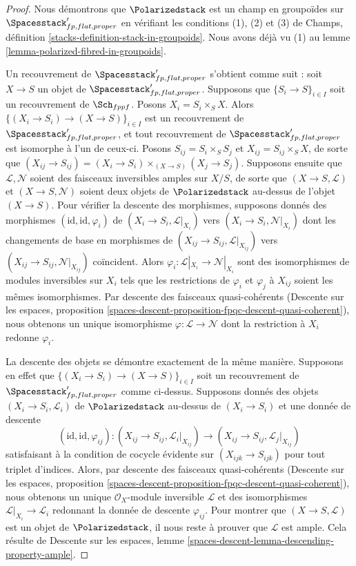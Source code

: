 \begin{proof}
Nous démontrons que $\Polarizedstack$ est un champ en groupoïdes sur
$\Spacesstack'_{fp, flat, proper}$ en vérifiant les conditions (1), (2) et (3)
de Champs, définition \ref{stacks-definition-stack-in-groupoids}.
Nous avons déjà vu (1) au lemme
\ref{lemma-polarized-fibred-in-groupoids}.

\medskip\noindent
Un recouvrement de $\Spacesstack'_{fp, flat, proper}$ s'obtient comme suit :
soit $X \to S$ un objet de $\Spacesstack'_{fp, flat, proper}$.
Supposons que $\{S_i \to S\}_{i \in I}$ soit un recouvrement de
$\Sch_{fppf}$. Posons $X_i = S_i \times_S X$. Alors
$\{(X_i \to S_i) \to (X \to S)\}_{i \in I}$ est un recouvrement de
$\Spacesstack'_{fp, flat, proper}$, et tout recouvrement de
$\Spacesstack'_{fp, flat, proper}$ est isomorphe à l'un de ceux-ci.
Posons $S_{ij} = S_i \times_S S_j$ et $X_{ij} = S_{ij} \times_S X$, de sorte
que $(X_{ij} \to S_{ij}) =
(X_i \to S_i) \times_{(X \to S)} (X_j \to S_j)$.
Supposons ensuite que $\mathcal{L}, \mathcal{N}$ soient des faisceaux
inversibles amples sur $X/S$, de sorte que
$(X \to S, \mathcal{L})$ et $(X \to S, \mathcal{N})$ soient deux objets de
$\Polarizedstack$ au-dessus de l'objet $(X \to S)$.
Pour vérifier la descente des morphismes, supposons donnés des morphismes
$(\text{id}, \text{id}, \varphi_i)$ de
$(X_i \to S_i, \mathcal{L}|_{X_i})$ vers
$(X_i \to S_i, \mathcal{N}|_{X_i})$
dont les changements de base en morphismes de
$(X_{ij} \to S_{ij}, \mathcal{L}|_{X_{ij}})$ vers
$(X_{ij} \to S_{ij}, \mathcal{N}|_{X_{ij}})$
coïncident. Alors
$\varphi_i : \mathcal{L}|_{X_i} \to \mathcal{N}|_{X_i}$
sont des isomorphismes de modules inversibles sur $X_i$ tels que les
restrictions de $\varphi_i$ et $\varphi_j$ à $X_{ij}$ soient les mêmes
isomorphismes.
Par descente des faisceaux quasi-cohérents
(Descente sur les espaces, proposition
\ref{spaces-descent-proposition-fpqc-descent-quasi-coherent}),
nous obtenons un unique isomorphisme $\varphi : \mathcal{L} \to \mathcal{N}$
dont la restriction à $X_i$ redonne $\varphi_i$.

\medskip\noindent
La descente des objets se démontre exactement de la même manière.
Supposons en effet que
$\{(X_i \to S_i) \to (X \to S)\}_{i \in I}$ soit un recouvrement de
$\Spacesstack'_{fp, flat, proper}$ comme ci-dessus.
Supposons donnés des objets $(X_i \to S_i, \mathcal{L}_i)$ de
$\Polarizedstack$ au-dessus de $(X_i \to S_i)$ et une donnée de descente
$$
(\text{id}, \text{id}, \varphi_{ij}) :
(X_{ij} \to S_{ij}, \mathcal{L}_i|_{X_{ij}})
\to
(X_{ij} \to S_{ij}, \mathcal{L}_j|_{X_{ij}})
$$
satisfaisant à la condition de cocycle évidente sur
$(X_{ijk} \to S_{ijk})$ pour tout triplet d'indices.
Alors, par descente des faisceaux quasi-cohérents
(Descente sur les espaces, proposition
\ref{spaces-descent-proposition-fpqc-descent-quasi-coherent}),
nous obtenons un unique $\mathcal{O}_X$-module inversible $\mathcal{L}$ et des
isomorphismes $\mathcal{L}|_{X_i} \to \mathcal{L}_i$ redonnant la donnée de
descente $\varphi_{ij}$.
Pour montrer que $(X \to S, \mathcal{L})$ est un objet de
$\Polarizedstack$, il nous reste à prouver que $\mathcal{L}$ est ample.
Cela résulte de Descente sur les espaces, lemme
\ref{spaces-descent-lemma-descending-property-ample}.


\end{proof}
